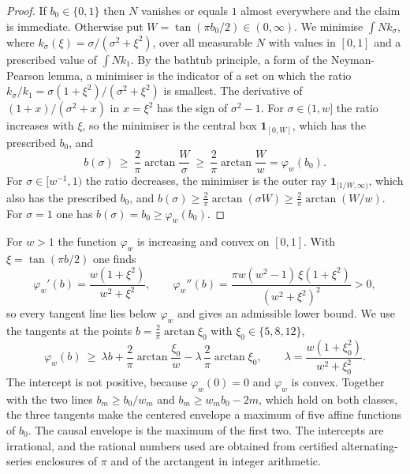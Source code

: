 \documentclass[10pt]{article}
\theoremstyle{remark}
\begin{document}
\begin{proof}
If $b_0\in\{0,1\}$ then $N$ vanishes or equals $1$ almost everywhere and the claim is immediate. Otherwise put $W=\tan(\pi b_0/2)\in(0,\infty)$. We minimise $\int Nk_\sigma$, where $k_\sigma(\xi)=\sigma/(\sigma^2+\xi^2)$, over all measurable $N$ with values in $[0,1]$ and a prescribed value of $\int Nk_1$. By the bathtub principle, a form of the Neyman-Pearson lemma, a minimiser is the indicator of a set on which the ratio $k_\sigma/k_1=\sigma(1+\xi^2)/(\sigma^2+\xi^2)$ is smallest. The derivative of $(1+x)/(\sigma^2+x)$ in $x=\xi^2$ has the sign of $\sigma^2-1$. For $\sigma\in(1,w]$ the ratio increases with $\xi$, so the minimiser is the central box $\mathbf 1_{[0,W]}$, which has the prescribed $b_0$, and
\[
b(\sigma)\ \ge\ \frac2\pi\arctan\frac W\sigma\ \ge\ \frac2\pi\arctan\frac Ww=\varphi_w(b_0).
\]
For $\sigma\in[w^{-1},1)$ the ratio decreases, the minimiser is the outer ray $\mathbf 1_{[1/W,\infty)}$, which also has the prescribed $b_0$, and $b(\sigma)\ge\frac2\pi\arctan(\sigma W)\ge\frac2\pi\arctan(W/w)$. For $\sigma=1$ one has $b(\sigma)=b_0\ge\varphi_w(b_0)$.
\end{proof}

For $w>1$ the function $\varphi_w$ is increasing and convex on $[0,1]$. With $\xi=\tan(\pi b/2)$ one finds
\[
\varphi_w'(b)=\frac{w(1+\xi^2)}{w^2+\xi^2},\qquad
\varphi_w''(b)=\frac{\pi w(w^2-1)\,\xi(1+\xi^2)}{(w^2+\xi^2)^2}>0,
\]
so every tangent line lies below $\varphi_w$ and gives an admissible lower bound. We use the tangents at the points $b=\frac2\pi\arctan\xi_0$ with $\xi_0\in\{5,8,12\}$,
\[
\varphi_w(b)\ \ge\ \lambda b+\frac2\pi\arctan\frac{\xi_0}{w}-\lambda\,\frac2\pi\arctan\xi_0,\qquad \lambda=\frac{w(1+\xi_0^2)}{w^2+\xi_0^2}.
\]
The intercept is not positive, because $\varphi_w(0)=0$ and $\varphi_w$ is convex. Together with the two lines $b_m\ge b_0/w_m$ and $b_m\ge w_mb_0-2m$, which hold on both classes, the three tangents make the centered envelope a maximum of five affine functions of $b_0$. The causal envelope is the maximum of the first two. The intercepts are irrational, and the rational numbers used are obtained from certified alternating-series enclosures of $\pi$ and of the arctangent in integer arithmetic.
\end{document}
